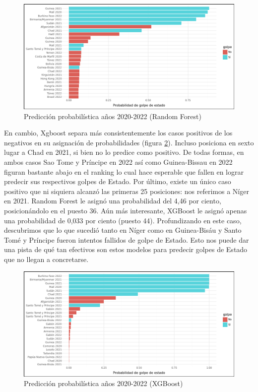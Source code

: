 \documentclass{article}
\begin{document}
\begin{figure}[H]
 \centering 
 \includegraphics[width=1\textwidth]{5_prob_rf.png}
 \caption{Predicción probabilística años 2020-2022 (Random Forest) \label{fig:prob_rf}}
\end{figure}

En cambio, Xgboost separa más consistentemente los casos positivos de los negativos
en su asignación de probabilidades (figura \ref{fig:prob_xgb}). Incluso posiciona en sexto lugar
a Chad en 2021, si bien no lo predice como positivo. De todas formas, en ambos casos 
Sao Tome y Príncipe en 2022 así como Guinea-Bissau en 2022 figuran bastante abajo en el ranking
lo cual hace esperable que fallen en lograr predecir sus respectivos golpes de Estado. Por 
último, existe un único caso positivo que ni siquiera alcanzó las primeras 25 posiciones: nos
referimos a Níger en 2021. Random Forest le asignó una probabilidad del 4,46 por ciento, 
posicionándolo en el puesto 36. Aún más interesante, XGBoost le asignó apenas una probabilidad
de 0,033 por ciento (puesto 44). Profundizando en este caso, descubrimos que lo que sucedió tanto en 
Níger como en Guinea-Bisáu y Santo Tomé y Príncipe fueron intentos fallidos de golpe de Estado.
Esto nos puede dar una pista de qué tan efectivos son estos modelos para predecir golpes de Estado 
que no llegan a concretarse.

\begin{figure}[H]
 \centering 
 \includegraphics[width=1\textwidth]{6_prob_xgb.png}
 \caption{Predicción probabilística años 2020-2022 (XGBoost) \label{fig:prob_xgb}}
\end{figure}
\end{document}

